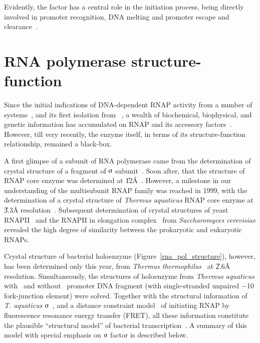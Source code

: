 Evidently, the \s{} factor has a central role in the initiation
process, being directly involved in promoter recognition, DNA
melting and promoter escape and
clearance~\citep{Gross1998,Helmann1988}.

\section{RNA polymerase structure-function}
\label{crystal}

Since the initial indications of DNA-dependent RNAP activity from
a number of systems~\citep{Weiss1959,Huang1960,Hurwitz1960}, and
its first isolation from ~\citep{Chamberlin1962}, a
wealth of biochemical, biophysical, and genetic information has
accumulated on RNAP and its accessory
factors~\citep{von1984,Erie1992,Gross1996a}. However, till very
recently, the enzyme itself, in terms of its structure-function
relationship, remained a black-box.

A first glimpse of a subunit of RNA polymerase came from the
determination of crystal structure of a fragment of 
$\sigmaup$ subunit~\citep{Malhotra1996}. Soon after, that
the structure of  RNAP core enzyme was determined at
\U{12}{\AA}~\citep{Darst1998}. However, a milestone in our
understanding of the multisubunit RNAP family was reached in 1999,
with the determination of a crystal structure of \emph{Thermus
aquaticus} RNAP core enzyme at \U{3.3}{\AA}
resolution~\citep[][PDB accession 1DDQ]{Zhang1999}. Subsequent
determination of crystal structures of yeast
RNAPII~\citep{Cramer2001} and the RNAPII in elongation
complex~\citep{Gnatt2001} from \emph{Saccharomyces cerevisiae}
revealed the high degree of similarity between the prokaryotic and
eukaryotic RNAPs.

Crystal structure of bacterial holoenzyme
(Figure~\ref{rna_pol_structure}), however, has been determined
only this year, from \emph{Thermus thermophilus}~\citep{Vassy2002}
at \U{2.6}{\AA} resolution. Simultaneously, the structures of
holoenzyme from \emph{Thermus aquaticus}
with~\citep{Murakami2002a} and without~\citep{Murakami2002b}
promoter DNA fragment (with single-stranded unpaired $-$10
fork-junction element) were solved. Together with the structural
information of \emph{T. aquaticus}
$\sigmaup$~\citep{Campbell2002}, and a distance constraint
model~\citep{Mekler2002} of initiating RNAP by fluorescence
resonance energy transfer (FRET), all these information constitute
the plausible ``structural model'' of bacterial
transcription~\citep{Korzheva2000,Naryshkin2000,Mooney1999,Landick2001,Young2002}.
A summary of this model with special emphasis on $\sigmaup$ factor
is described below.

